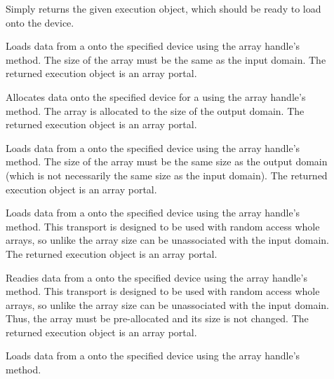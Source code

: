 \begin{description}
\item[]
   Simply returns the given execution
  object, which should be ready to load onto the device.
\item[] 
  Loads data from a  onto the specified device using the array handle's  method.
  The size of the array must be the same as the input domain.
  The returned execution object is an array portal.
\item[] 
  Allocates data onto the specified device for a  using the array handle's  method.
  The array is allocated to the size of the output domain.
  The returned execution object is an array portal.
\item[] 
  Loads data from a  onto the specified device using the array handle's  method.
  The size of the array must be the same size as the output domain (which is not necessarily the same size as the input domain).
  The returned execution object is an array portal.
\item[] 
  Loads data from a  onto the specified device using the array handle's  method.
  This transport is designed to be used with random access whole arrays, so unlike  the array size can be unassociated with the input domain.
  The returned execution object is an array portal.
\item[] 
  Readies data from a  onto the specified device using the array handle's  method.
  This transport is designed to be used with random access whole arrays, so unlike  the array size can be unassociated with the input domain.
  Thus, the array must be pre-allocated and its size is not changed.
  The returned execution object is an array portal.
\item[] 
  Loads data from a  onto the specified device using the array handle's  method.

\end{description}
